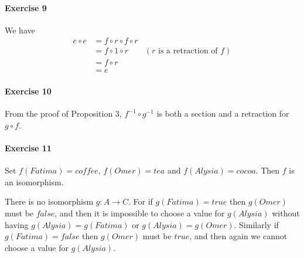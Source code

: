 \documentclass{report}
\newcommand{\inv}[1]{\ensuremath{{#1}^{-1}}}
\begin{document}
    \paragraph{Exercise 9}
    We have
    \begin{align*}
        e \circ e & = f \circ r \circ f \circ r \\
        & = f \circ 1 \circ r & (\text{$r$ is a retraction of $f$}) \\
        & = f \circ r \\
        & = e
    \end{align*}

    \paragraph{Exercise 10}
    From the proof of Proposition 3, $\inv{f} \circ \inv{g}$ is both a section and a retraction for
    $g \circ f$.

    \paragraph{Exercise 11}
    Set $f(Fatima) = coffee$, $f(Omer) = tea$ and $f(Alysia) = cocoa$. Then $f$ is an isomorphism.

    There is no isomorphism $g : A \rightarrow C$. For if $g(Fatima) = true$ then $g(Omer)$ must be $false$,
    and then it is impossible to choose a value for $g(Alysia)$ without having $g(Alysia) = g(Fatima)$
    or $g(Alysia) = g(Omer)$. Similarly if $g(Fatima) = false$ then $g(Omer)$ must be $true$, and then
    again we cannot choose a value for $g(Alysia)$.
\end{document}
